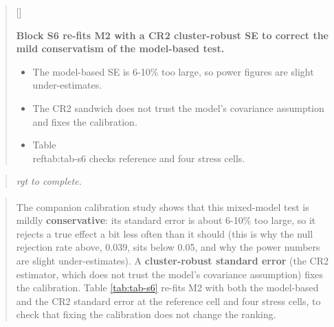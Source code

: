\documentclass[
  11pt,
]{article}
\newcounter{pgraph}
\newenvironment{bullets}{%
  \stepcounter{pgraph}%
  \begin{quote}\small\sffamily\color[gray]{0.30}%
  {\normalfont\scriptsize\color[gray]{0.58}[\thepgraph]\enspace}}{%
  \end{quote}}
\newenvironment{rgt}{%
  \begin{quote}\small\itshape\color[RGB]{20,60,160}}{%
  \end{quote}}
\newenvironment{orig}{%
  \begin{quote}\normalsize\color[gray]{0.55}}{%
  \end{quote}}
\begin{document}
\begin{bullets}

\textbf{Block S6 re-fits M2 with a CR2 cluster-robust SE to correct
the mild conservatism of the model-based test.}

\begin{itemize}\setlength{\itemsep}{2pt}\setlength{\parskip}{0pt}
\item The model-based SE is 6-10\% too large, so power figures are
slight under-estimates.
\item The CR2 sandwich does not trust the model's covariance
assumption and fixes the calibration.
\item Table \\ref{tab:tab-s6} checks reference and four stress cells.
\end{itemize}

\end{bullets}

\begin{rgt}
rgt to complete.

\end{rgt}

\begin{orig}
The companion calibration study\textsuperscript{} shows
that this mixed-model test is mildly \textbf{conservative}: its standard
error is about 6-10\% too large, so it rejects a true effect a bit
less often than it should (this is why the null rejection rate above,
0.039, sits below 0.05, and why the power numbers are slight
under-estimates). A \textbf{cluster-robust standard error} (the CR2
estimator, which does not trust the model's covariance assumption)
fixes the calibration. Table \ref{tab:tab-s6} re-fits M2 with both
the model-based and the CR2 standard error at the reference cell and
four stress cells, to check that fixing the calibration does not
change the ranking.

\end{orig}
\end{document}
